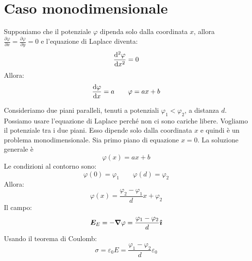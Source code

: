 \section{Caso monodimensionale}
Supponiamo che il potenziale $\varphi$ dipenda solo dalla coordinata $x$, allora $\frac{\partial\varphi}{\partial x}=\frac{\partial\varphi}{\partial y}=0$ e l'equazione di Laplace diventa:
\begin{equation*}\frac{\mathrm{d}^2\varphi}{\mathrm{d} x^2}=0\end{equation*}
Allora:
\begin{equation*}\frac{\mathrm{d} \varphi}{\mathrm{d} x}=a\qquad \varphi=ax+b\end{equation*}
\begin{Es}[condensatore]
Consideriamo due piani paralleli, tenuti a potenziali $\varphi_1<\varphi_2$, a distanza $d$. Possiamo usare l'equazione di Laplace perché non ci sono cariche libere. Vogliamo il potenziale tra i due piani. Esso dipende solo dalla coordinata $x$ e quindi è un problema monodimensionale. Sia primo piano di equazione $x=0$. La soluzione generale è 
\begin{equation*}\varphi(x)=ax+b\end{equation*}
Le condizioni al contorno sono:
\begin{equation*}\varphi(0)=\varphi_1\qquad\varphi(d)=\varphi_2\end{equation*}
Allora:
\begin{equation*}\varphi(x)=\frac{\varphi_2-\varphi_1}{d}x+\varphi_2\end{equation*}
Il campo:
\begin{equation*}\boldsymbol{E}_E=-\boldsymbol{\nabla}\varphi=\frac{\varphi_1-\varphi_2}{d}\boldsymbol{\hat {\imath}}\end{equation*}
Usando il teorema di Coulomb:
\begin{equation*}\sigma=\varepsilon_0E=\frac{\varphi_1-\varphi_2}{d}\varepsilon_0\end{equation*}
\end{Es}
